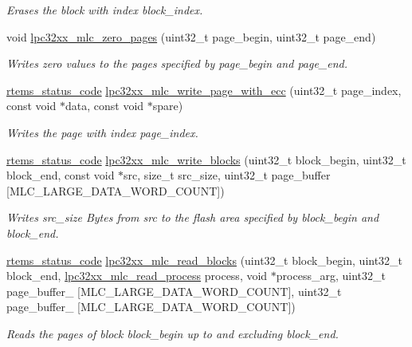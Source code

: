 \begin{DoxyCompactItemize}
\begin{DoxyCompactList}\small\item\em Erases the block with index {\itshape block\+\_\+index}. \end{DoxyCompactList}\item 
void \mbox{\hyperlink{group__lpc32xx__nand__mlc_gae790b87623d06d4795abd696698e9344}{lpc32xx\+\_\+mlc\+\_\+zero\+\_\+pages}} (uint32\+\_\+t page\+\_\+begin, uint32\+\_\+t page\+\_\+end)
\begin{DoxyCompactList}\small\item\em Writes zero values to the pages specified by {\itshape page\+\_\+begin} and {\itshape page\+\_\+end}. \end{DoxyCompactList}\item 
\mbox{\hyperlink{group__ClassicStatus_ga545d41846817eaba6143d52ee4d9e9fe}{rtems\+\_\+status\+\_\+code}} \mbox{\hyperlink{group__lpc32xx__nand__mlc_ga3e7231705d7d840e2e71fbb64534b2f0}{lpc32xx\+\_\+mlc\+\_\+write\+\_\+page\+\_\+with\+\_\+ecc}} (uint32\+\_\+t page\+\_\+index, const void $\ast$data, const void $\ast$spare)
\begin{DoxyCompactList}\small\item\em Writes the page with index {\itshape page\+\_\+index}. \end{DoxyCompactList}\item 
\mbox{\hyperlink{group__ClassicStatus_ga545d41846817eaba6143d52ee4d9e9fe}{rtems\+\_\+status\+\_\+code}} \mbox{\hyperlink{group__lpc32xx__nand__mlc_gafa7ec91e1dfa52e3bcc614f4a9a66ab2}{lpc32xx\+\_\+mlc\+\_\+write\+\_\+blocks}} (uint32\+\_\+t block\+\_\+begin, uint32\+\_\+t block\+\_\+end, const void $\ast$src, size\+\_\+t src\+\_\+size, uint32\+\_\+t page\+\_\+buffer \mbox{[}M\+L\+C\+\_\+\+L\+A\+R\+G\+E\+\_\+\+D\+A\+T\+A\+\_\+\+W\+O\+R\+D\+\_\+\+C\+O\+U\+NT\mbox{]})
\begin{DoxyCompactList}\small\item\em Writes {\itshape src\+\_\+size} Bytes from {\itshape src} to the flash area specified by {\itshape block\+\_\+begin} and {\itshape block\+\_\+end}. \end{DoxyCompactList}\item 
\mbox{\hyperlink{group__ClassicStatus_ga545d41846817eaba6143d52ee4d9e9fe}{rtems\+\_\+status\+\_\+code}} \mbox{\hyperlink{group__lpc32xx__nand__mlc_ga2d5f41c8abd5910ad853e7ba096c9f7b}{lpc32xx\+\_\+mlc\+\_\+read\+\_\+blocks}} (uint32\+\_\+t block\+\_\+begin, uint32\+\_\+t block\+\_\+end, \mbox{\hyperlink{group__lpc32xx__nand__mlc_ga8adf1c46b26e07838b729a78d83332ee}{lpc32xx\+\_\+mlc\+\_\+read\+\_\+process}} process, void $\ast$process\+\_\+arg, uint32\+\_\+t page\+\_\+buffer\+\_ \mbox{[}M\+L\+C\+\_\+\+L\+A\+R\+G\+E\+\_\+\+D\+A\+T\+A\+\_\+\+W\+O\+R\+D\+\_\+\+C\+O\+U\+NT\mbox{]}, uint32\+\_\+t page\+\_\+buffer\+\_ \mbox{[}M\+L\+C\+\_\+\+L\+A\+R\+G\+E\+\_\+\+D\+A\+T\+A\+\_\+\+W\+O\+R\+D\+\_\+\+C\+O\+U\+NT\mbox{]})
\begin{DoxyCompactList}\small\item\em Reads the pages of block {\itshape block\+\_\+begin} up to and excluding {\itshape block\+\_\+end}. \end{DoxyCompactList}\end{DoxyCompactItemize}

